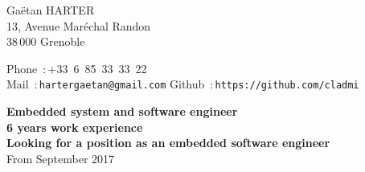\documentclass{cv}
\begin{document}
\begin{chapeau}
\hspace{1cm}
\begin{adresse}
        Gaëtan HARTER\\
        13, Avenue Maréchal Randon\\
        38\,000 Grenoble\\
\end{adresse}
\begin{etatcivil}
        Phone~:\,+33~6~85~33~33~22\\
        Mail~:\,\texttt{hartergaetan@gmail.com}
        Github~:\,\texttt{https://github.com/cladmi}
\end{etatcivil}
\hspace{0.5cm}
\end{chapeau}
\vspace{0.5cm}
\begin{center}
        \textbf{\Large Embedded system and software engineer\\}
        \textbf{\large 6 years work experience\\}
        \vspace{0.5em}
        \textbf{\large Looking for a position as an embedded software engineer\\} %
        {From September 2017}
\end{center}



\end{document}
